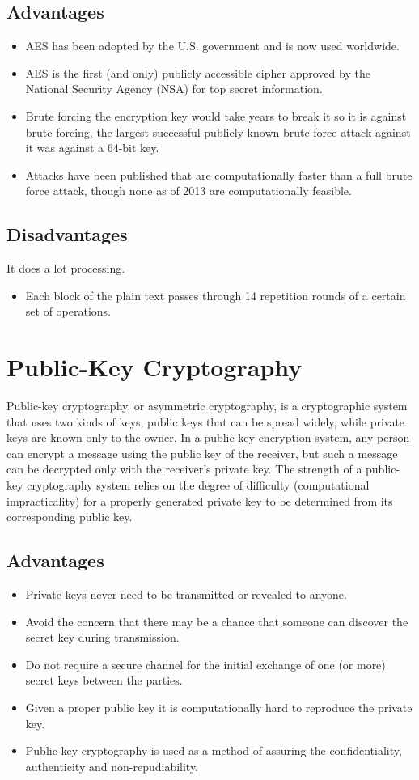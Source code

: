 \subsection{Advantages}
\begin{itemize}
	\item AES has been adopted by the U.S. government and is now used worldwide.
	\item AES is the first (and only) publicly accessible cipher approved by the National Security Agency (NSA) for top secret information.
	\item Brute forcing the encryption key would take years to break it so it is against brute forcing, the largest successful  publicly known brute force attack against it was against a 64-bit key.
	\item Attacks have been published that are computationally faster than a full brute force attack, though none as of 2013 are computationally feasible.
\end{itemize}

\subsection{Disadvantages}
It does a lot processing.
\begin{itemize}
	\item Each block of the plain text passes through 14 repetition rounds of a certain set of operations.
\end{itemize}

\section{Public-Key Cryptography}
\label{featuer:pkc}
Public-key cryptography, or asymmetric cryptography, is a cryptographic system that uses two kinds of keys, public keys that can be spread widely, while private keys are known only to the owner. In a public-key encryption system, any person can encrypt a message using the public key of the receiver, but such a message can be decrypted only with the receiver's private key. The strength of a public-key cryptography system relies on the degree of difficulty (computational impracticality) for a properly generated private key to be determined from its corresponding public key.
\subsection{Advantages}
\begin{itemize}
	\item Private keys never need to be transmitted or revealed to anyone.
	\item Avoid the concern that there may be a chance that someone can discover the secret key during transmission.
	\item Do not require a secure channel for the initial exchange of one (or more) secret keys between the parties.
	\item Given a proper public key it is computationally hard to reproduce the private key.
	\item Public-key cryptography is used as a method of assuring the confidentiality, authenticity and non-repudiability.
\end{itemize}
